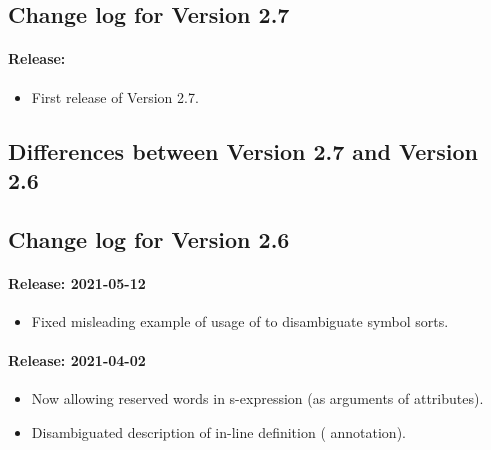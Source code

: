\subsection{Change log for Version 2.7}

\paragraph{Release: }
\begin{itemize}
\item First release of Version 2.7.
\end{itemize}

\subsection{Differences between Version 2.7 and Version 2.6}


\subsection{Change log for Version 2.6}

\paragraph{Release: 2021-05-12}
\begin{itemize}
\item Fixed misleading example of usage of  to disambiguate symbol sorts.
\end{itemize}

\paragraph{Release: 2021-04-02}
\begin{itemize}
\item Now allowing reserved words in s-expression (as arguments of attributes).
\item Disambiguated description of in-line definition ( annotation).
\end{itemize}


